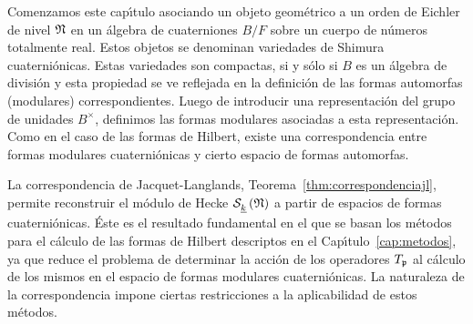 % 

Comenzamos este cap\'{\i}tulo asociando un objeto geom\'{e}trico a un orden
de Eichler de nivel $\frak{N}$ en un \'{a}lgebra de cuaterniones $B/F$
sobre un cuerpo de n\'{u}meros totalmente real. Estos objetos se denominan
variedades de Shimura cuaterni\'{o}nicas. Estas variedades son compactas,
si y s\'{o}lo si $B$ es un \'{a}lgebra de divisi\'{o}n y esta propiedad se
ve reflejada en la definici\'{o}n de las formas automorfas (modulares)
correspondientes. Luego de introducir una representaci\'{o}n del grupo de
unidades $B^{\times}$, definimos las formas modulares asociadas a esta
representaci\'{o}n. Como en el caso de las formas de Hilbert, existe una
correspondencia entre formas modulares cuaterni\'{o}nicas y cierto espacio de
formas automorfas.

La correspondencia de Jacquet-Langlands, Teorema~\ref{thm:correspondenciajl},
permite reconstruir el m\'{o}dulo de Hecke $\spitzH{k}{\frak{N}}$ a partir de
espacios de formas cuaterni\'{o}nicas. \'{E}ste es el resultado fundamental en
el que se basan los m\'{e}todos para el c\'{a}lculo de las formas de Hilbert
descriptos en el Cap\'{\i}tulo~\ref{cap:metodos}, ya que reduce el problema
de determinar la acci\'{o}n de los operadores $T_{\frak{p}}$ al c\'{a}lculo de
los mismos en el espacio de formas modulares cuaterni\'{o}nicas. La naturaleza
de la correspondencia impone ciertas restricciones a la aplicabilidad de estos
m\'{e}todos.

